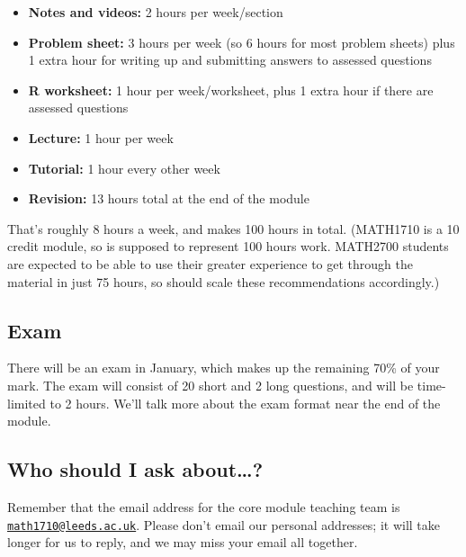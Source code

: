 \documentclass[
  a4paper,
]{book}
\providecommand{\tightlist}{%
  \setlength{\itemsep}{0pt}\setlength{\parskip}{0pt}}
\theoremstyle{definition}
\theoremstyle{definition}
\theoremstyle{definition}
\theoremstyle{definition}
\theoremstyle{remark}
\begin{document}
\begin{itemize}
\tightlist
\item
  \textbf{Notes and videos:} 2 hours per week/section
\item
  \textbf{Problem sheet:} 3 hours per week (so 6 hours for most problem sheets) plus 1 extra hour for writing up and submitting answers to assessed questions
\item
  \textbf{R worksheet:} 1 hour per week/worksheet, plus 1 extra hour if there are assessed questions
\item
  \textbf{Lecture:} 1 hour per week
\item
  \textbf{Tutorial:} 1 hour every other week
\item
  \textbf{Revision:} 13 hours total at the end of the module
\end{itemize}

That's roughly 8 hours a week, and makes 100 hours in total. (MATH1710 is a 10 credit module, so is supposed to represent 100 hours work. MATH2700 students are expected to be able to use their greater experience to get through the material in just 75 hours, so should scale these recommendations accordingly.)

\hypertarget{exam}{%
\subsection*{Exam}\label{exam}}

There will be an exam in January, which makes up the remaining 70\% of your mark. The exam will consist of 20 short and 2 long questions, and will be time-limited to 2 hours. We'll talk more about the exam format near the end of the module.

\hypertarget{ask}{%
\subsection*{Who should I ask about\ldots?}\label{ask}}

Remember that the email address for the core module teaching team is \href{mailto:math1710@leeds.ac.uk}{\nolinkurl{math1710@leeds.ac.uk}}. Please don't email our personal addresses; it will take longer for us to reply, and we may miss your email all together.
\end{document}
